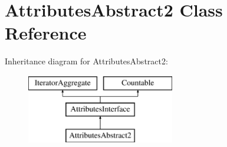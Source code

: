 \hypertarget{class_pes_1_1_dom_1_1_node_1_1_attributes_1_1_attributes_abstract2}{}\section{Attributes\+Abstract2 Class Reference}
\label{class_pes_1_1_dom_1_1_node_1_1_attributes_1_1_attributes_abstract2}
Inheritance diagram for Attributes\+Abstract2\+:\begin{figure}[H]
\begin{center}
\leavevmode
\includegraphics[height=3.000000cm]{class_pes_1_1_dom_1_1_node_1_1_attributes_1_1_attributes_abstract2}
\end{center}
\end{figure}
